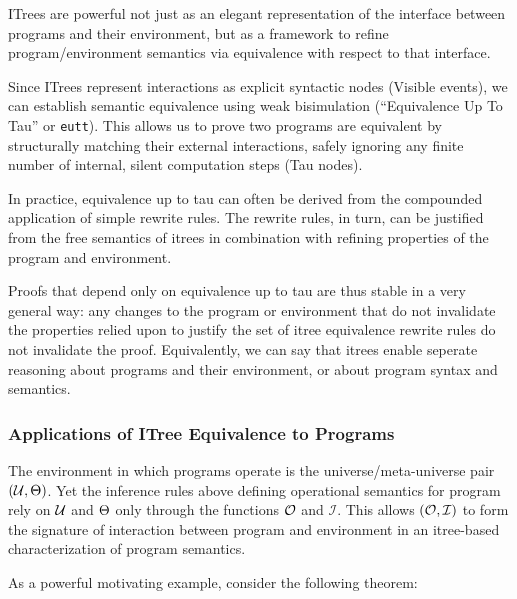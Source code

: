 \documentclass{article}
\begin{document}

ITrees are powerful not just as an elegant representation of the interface between programs and their environment, but as a framework to refine program/environment semantics via equivalence with respect to that interface.

Since ITrees represent interactions as explicit syntactic nodes (Visible events), we can establish semantic equivalence using weak bisimulation (``Equivalence Up To Tau'' or \texttt{eutt}). This allows us to prove two programs are equivalent by structurally matching their external interactions, safely ignoring any finite number of internal, silent computation steps (Tau nodes).

In practice, equivalence up to tau can often be derived from the compounded application of simple rewrite rules. The rewrite rules, in turn, can be justified from the free semantics of itrees in combination with refining properties of the program and environment.

Proofs that depend only on equivalence up to tau are thus stable in a very general way: any changes to the program or environment that do not invalidate the properties relied upon to justify the set of itree equivalence rewrite rules do not invalidate the proof. Equivalently, we can say that itrees enable seperate reasoning about programs and their environment, or about program syntax and semantics.

\subsubsection{Applications of ITree Equivalence to \AIM Programs}


\newcommand{\OI}{\ensuremath{(\O, \mathcal{I})~}}

The environment in which \AIM programs operate is the universe/meta-universe pair $(\mathcal{U}, \Theta)$. Yet the inference rules above defining operational semantics for \AIM program rely on $\mathcal{U}$ and $\Theta$ only through the functions $\mathcal{O}$ and $\mathcal{I}$. This allows \OI to form the signature of interaction between program and environment in an itree-based characterization of \AIM program semantics.

As a powerful motivating example, consider the following theorem:
\end{document}
